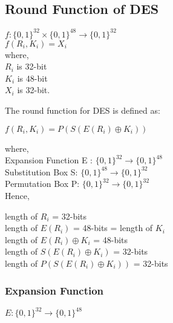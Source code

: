 \documentclass[11pt]{article}
\begin{document}
\subsection{Round Function of DES}
\begin{center}
    $f: \{0,1\}^{32} \times \{0,1\}^{48} \rightarrow \{0,1\}^{32}$\\
    $f(R_i, K_i) = X_i$\\
    where,\\
    $R_i$ is 32-bit\\
    $K_i$ is 48-bit\\
    $X_i$ is 32-bit.
\end{center}
The round function for DES is defined as:
\begin{center}
    $f(R_i, K_i) = P(S(E(R_i) \oplus K_i))$\\
\end{center}
where,\\
    Expansion Function E : $\{0, 1\}^{32} \rightarrow \{0, 1\}^{48}$\\
    Substitution Box S: $\{0, 1\}^{48} \rightarrow \{0, 1\}^{32}$\\
    Permutation Box P: $\{0, 1\}^{32} \rightarrow \{0, 1\}^{32}$\\
Hence,
\begin{center}
    length of $R_i$ = 32-bits\\
    length of $E(R_i)$ = 48-bits = length of $K_i$\\
    length of $E(R_i) \oplus K_i$ = 48-bits\\
    length of $S(E(R_i) \oplus K_i)$ = 32-bits\\
    length of $P(S(E(R_i) \oplus K_i))$ = 32-bits
\end{center}
\subsubsection{Expansion Function}
\begin{center}
    $E: \{0, 1\}^{32} \rightarrow \{0, 1\}^{48}$\\    
\end{center}
\end{document}
